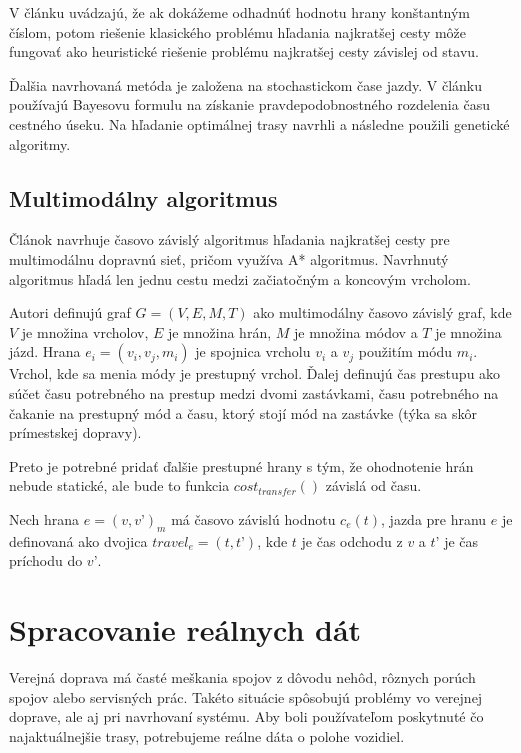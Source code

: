 V článku \cite{trains} uvádzajú, že ak dokážeme odhadnúť hodnotu hrany konštantným číslom, potom riešenie klasického problému hľadania najkratšej cesty môže fungovať ako heuristické riešenie problému najkratšej cesty závislej od stavu.

Ďalšia navrhovaná metóda je založena na stochastickom čase jazdy. V článku \cite{stochastic} používajú Bayesovu formulu na získanie pravdepodobnostného rozdelenia času cestného úseku. Na hľadanie optimálnej trasy navrhli a následne použili genetické algoritmy.

\subsection{Multimodálny algoritmus}
\label{sec:multimodal-algorithm}
Článok \cite{timedependent} navrhuje časovo závislý algoritmus hľadania najkratšej cesty pre multimodálnu dopravnú sieť, pričom využíva A* algoritmus. Navrhnutý algoritmus hľadá len jednu cestu medzi začiatočným a koncovým vrcholom. 

Autori definujú graf $G = (V, E, M, T)$ ako multimodálny časovo závislý graf, kde $V$ je množina vrcholov, $E$ je množina hrán, $M$ je množina módov a $T$ je množina jázd.
Hrana $e_i = (v_i, v_j, m_i)$ je spojnica vrcholu $v_i$ a $v_j$ použitím módu $m_i$. Vrchol, kde sa menia módy je prestupný vrchol. Ďalej definujú čas prestupu ako súčet času potrebného na prestup medzi dvomi zastávkami, času potrebného na čakanie na prestupný mód a času, ktorý stojí mód na zastávke (týka sa skôr prímestskej dopravy).

Preto je potrebné pridať ďalšie prestupné hrany s tým, že ohodnotenie hrán nebude statické, ale bude to funkcia $cost_{transfer}()$ závislá od času.

Nech hrana $e = (v, v’)_m$ má časovo závislú hodnotu $c_e(t)$, jazda pre hranu $e$ je definovaná ako dvojica $travel_e = (t, t’)$, kde $t$ je čas odchodu z $v$ a $t’$ je čas príchodu do $v’$.

\section{Spracovanie reálnych dát}
\label{sec:models}
Verejná doprava má časté meškania spojov z dôvodu nehôd, rôznych porúch spojov alebo servisných prác. Takéto situácie spôsobujú problémy vo verejnej doprave, ale aj pri navrhovaní systému. Aby boli používateľom poskytnuté čo najaktuálnejšie trasy, potrebujeme reálne dáta o polohe vozidiel.

